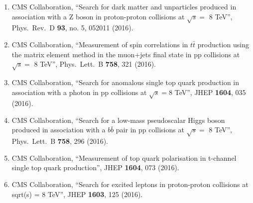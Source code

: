 \begin{itemize}
\begin{enumerate}
\item CMS Collaboration, ``Search for dark matter and unparticles produced in association with a Z boson in proton-proton collisions at $\sqrt s=$ 8 TeV'', Phys.\ Rev.\ D {\bf 93}, no. 5, 052011 (2016).

\item CMS Collaboration, ``Measurement of spin correlations in $t\bar{t}$ production using the matrix element method in the muon+jets final state in pp collisions at $\sqrt{s} =$ 8 TeV'', Phys.\ Lett.\ B {\bf 758}, 321 (2016).

\item CMS Collaboration, ``Search for anomalous single top quark production in association with a photon in pp collisions at $ \sqrt{s}=8 $ TeV'', JHEP {\bf 1604}, 035 (2016).

\item CMS Collaboration, ``Search for a low-mass pseudoscalar Higgs boson produced in association with a $b\bar{b}$ pair in pp collisions at $\sqrt{s} =$ 8 TeV'', Phys.\ Lett.\ B {\bf 758}, 296 (2016).

\item CMS Collaboration, ``Measurement of top quark polarisation in t-channel single top quark production'', JHEP {\bf 1604}, 073 (2016).

\item CMS Collaboration, ``Search for excited leptons in proton-proton collisions at sqrt(s) = 8 TeV'', JHEP {\bf 1603}, 125 (2016).


\end{enumerate}
\end{itemize}
